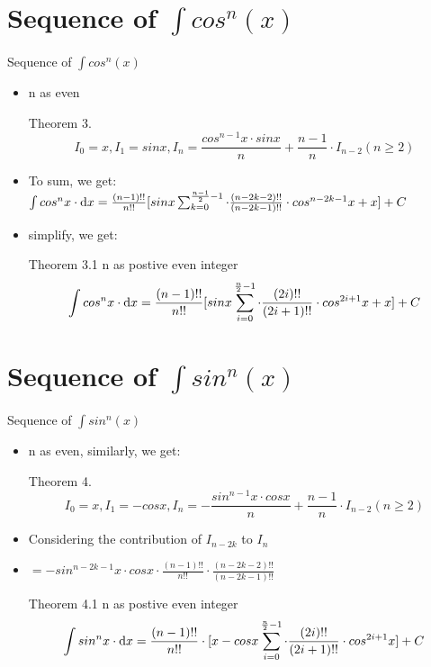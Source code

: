 \documentclass[11pt, thmnum, eqsecnum, allcites, dark]{mathbeamer}
\begin{document}
\section{Sequence of $\int cos^n(x)$}
\begin{frame}{Sequence of $\int cos^n(x)$}
\begin{itemize}[<+->]
\item n as even
  \begin{block}{Theorem 3.}
 $$I_0 = x, I_1 = sinx, I_n = \frac{cos^{n-1}x \cdot sinx}{n} + \frac{n-1}{n} \cdot I_{n-2} (n \geq 2)$$
  \end{block}
\item To sum, we get:
$\int cos^nx \cdot {\rm d}x = \frac{(n-1)!!}{n!!}[sinx \sum_{k=0}^{\frac{n-1}{2}-1} \cdot \frac{(n-2k-2)!!}{(n-2k-1)!!} \cdot cos^{n-2k-1}x + x] + C$
\item simplify, we get:
  \begin{block}{Theorem 3.1}
n as postive even integer
 $$\int cos^nx \cdot {\rm d}x = \frac{(n-1)!!}{n!!}[sinx \sum_{i=0}^{\frac{n}{2}-1} \cdot \frac{(2i)!!}{(2i+1)!!} \cdot cos^{2i+1}x + x] + C$$
  \end{block}
\end{itemize}
\end{frame}

\section{Sequence of $\int sin^n(x)$}
\begin{frame}{Sequence of $\int sin^n(x)$}
\begin{itemize}[<+->]
\item n as even, similarly, we get:
  \begin{block}{Theorem 4.}
 $$I_0 = x, I_1 = -cosx, I_n = -\frac{sin^{n-1}x \cdot cosx}{n} + \frac{n-1}{n} \cdot I_{n-2} (n \geq 2)$$
  \end{block}
\item Considering the contribution of $I_{n-2k}$ to $I_n$
\item $=-sin^{n-2k-1}x \cdot cosx \cdot \frac{(n-1)!!}{n!!} \cdot \frac{(n-2k-2)!!}{(n-2k-1)!!}$
  \begin{block}{Theorem 4.1}
n as postive even integer
 $$\int sin^nx \cdot {\rm d}x = \frac{(n-1)!!}{n!!} \cdot [x - cosx \sum_{i=0}^{\frac{n}{2}-1} \cdot \frac{(2i)!!}{(2i+1)!!} \cdot cos^{2i+1}x] + C$$
  \end{block}
\end{itemize}
\end{frame}
\end{document}
